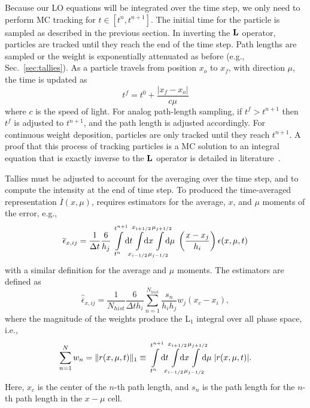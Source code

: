 Because our LO equations will be integrated over the time step, we only need to
perform MC tracking for $t\in[t^{n},t^{n+1}]$.  
The initial time for the particle is
sampled as described in the previous section. In inverting the $\mathbf{L}$ operator, particles
are tracked until they reach the end of the time step.  Path lengths are sampled or the
weight is exponentially attenuated as before (e.g., Sec.~\ref{sec:tallies}).  As a particle
travels from position $x_{o}$ to $x_{f}$, with direction $\mu$, the time is updated as 
\begin{equation}
    t^{f} = t^{0} + \frac{|x_{f} - x_{o}|}{c \mu}
\end{equation}
where $c$ is the speed of light. For analog path-length sampling, if $t^{f}>t^{n+1}$ then
$t^{f}$ is adjusted to $t^{n+1}$, and the path length is adjusted accordingly.  For continuous weight deposition, particles
are only tracked until they reach $t^{n+1}$.  A proof that this process of tracking
particles is a MC solution to an integral equation that is exactly inverse to the $\mathbf{L}$ operator is
detailed in literature~\cite{cj_thesis,shultis_mc}.  

Tallies must be adjusted to account for the averaging over the time step, and to compute the
intensity at the end of time step.  To produced the time-averaged representation
$\overline I(x,\mu)$, requires estimators for the average, $x$, and $\mu$ moments of the
error, e.g.,
\begin{equation}
    \overline\epsilon_{x,ij} = \frac{1}{\Delta t} \frac{6}{h_j}
    \int\limits_{t^{n}}^{t^{n+1}} \!\!\dd t \!\!\!
    \int\limits_{\xl}^{\xr} \!\!\!\!\! \dd x
    \hspace{-0.081in}\int\limits_{\mu_{j-1/2}}^{\mu_{j+1/2}} \hspace{-0.107in} \dd \mu
    \;\left(\frac{x - x_j}{h_{i}}\right) \epsilon(x,\mu,t)
\end{equation}
with a similar definition for the average and $\mu$ moments.  The estimators are defined
as
\begin{equation}
    \hat{\overline \epsilon}_{x,ij} =\frac{1}{N_{hist}} \frac{6}{\Delta t h_i} \sum_{n=1}^{N_{hist}}
    \frac{s_n}{h_{i}h_{j}} w_j \left(x_c - x_i\right),
\end{equation}
where the magnitude of the weights produce the L$_1$ integral over all phase space, i.e.,
\begin{equation}
\sum\limits_{n=1}^{N} w_n = \| r(x,\mu,t) \|_1 \equiv 
    \int\limits_{t^{n}}^{t^{n+1}} \!\!\dd t \!\!\!
    \int\limits_{\xl}^{\xr} \!\!\!\!\! \dd x
    \hspace{-0.081in}\int\limits_{\mu_{j-1/2}}^{\mu_{j+1/2}} \!\!\!\!\dd \mu\;
    |r(x,\mu,t)|.
\end{equation}
Here, $x_c$ is the center of the $n$-th
path length, and $s_{n}$ is the path length for the $n$-th path length in the $x-\mu$ cell.

